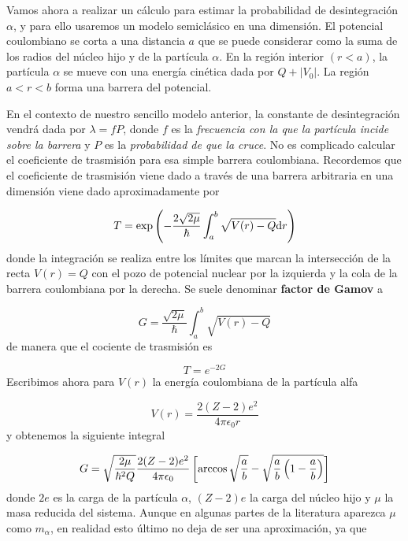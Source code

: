 Vamos ahora a realizar un cálculo para estimar la probabilidad de desintegración $\alpha$, y para ello usaremos un modelo semiclásico en una dimensión. El potencial coulombiano se corta a una distancia $a$ que se puede considerar como la suma de los radios del núcleo hijo y de la partícula $\alpha$. En la región interior $(r<a)$, la partícula $\alpha$ se mueve con una energía cinética dada por $Q+|V_0|$. La región $a<r<b$ forma una barrera del potencial. 

En el contexto de nuestro sencillo modelo anterior, la constante de desintegración vendrá dada por $\lambda = fP$, donde $f$ es la \textit{frecuencia con la que la partícula incide sobre la barrera} y $P$ es la \textit{probabilidad de que la cruce}. No es complicado calcular el coeficiente de trasmisión para esa simple barrera coulombiana. Recordemos que el coeficiente de trasmisión viene dado a través de una barrera arbitraria en una dimensión viene dado aproximadamente por

\begin{equation}
    T = \exp \left( -\frac{2\sqrt{2\mu}}{\hbar } \int_a^b \sqrt{V(r)-Q}\mathrm{d} r \right)
\end{equation}
donde la integración se realiza entre los límites que marcan la intersección de la recta $V(r) = Q$ con el pozo de potencial nuclear por la izquierda y la cola de la barrera coulombiana por la derecha. Se suele denominar \textbf{factor de Gamov} a 

\begin{equation}
    G = \frac{\sqrt{2\mu}}{\hbar} \int_a^b \sqrt{V(r)-Q}
\end{equation}
de manera que el cociente de trasmisión es

\begin{equation}
    T = e^{-2G}
\end{equation}
Escribimos ahora para $V(r)$ la energía coulombiana de la partícula alfa 

\begin{equation}
    V(r) = \frac{2(Z-2)e^2}{4\pi \epsilon_0 r}
\end{equation}
y obtenemos la siguiente integral

\begin{equation}
    G = \sqrt{\frac{2\mu}{\hbar^2Q}} \frac{2(Z-2)e^2}{4 \pi \epsilon_0} \left[ \arccos \sqrt{\frac{a}{b}}- \sqrt{\frac{a}{b}\left( 1-\frac{a}{b} \right)} \right]
\end{equation}
donde $2e$ es la carga de la partícula $\alpha$, $(Z-2)e$ la carga del núcleo hijo y $\mu$ la masa reducida del sistema. Aunque en algunas partes de la literatura aparezca $\mu$ como $m_\alpha$, en realidad esto último no deja de ser una aproximación, ya que 

